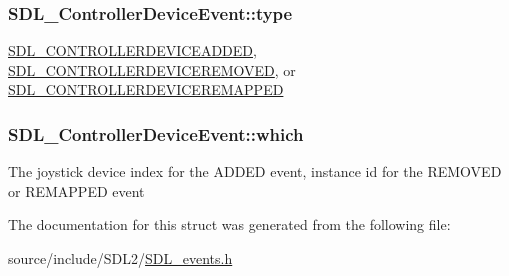 \subsubsection[{type}]{ S\+D\+L\+\_\+\+Controller\+Device\+Event\+::type}\label{struct_s_d_l___controller_device_event_a45b3807eaf70a5f5cf712455da277536}
\hyperlink{_s_d_l__events_8h_a3b589e89be6b35c02e0dd34a55f3fccaa9642de478348da1aba4fb5791e8c5314}{S\+D\+L\+\_\+\+C\+O\+N\+T\+R\+O\+L\+L\+E\+R\+D\+E\+V\+I\+C\+E\+A\+D\+D\+E\+D}, \hyperlink{_s_d_l__events_8h_a3b589e89be6b35c02e0dd34a55f3fccaae00ac6995dfb7b92bfae68b9f47ae07a}{S\+D\+L\+\_\+\+C\+O\+N\+T\+R\+O\+L\+L\+E\+R\+D\+E\+V\+I\+C\+E\+R\+E\+M\+O\+V\+E\+D}, or \hyperlink{_s_d_l__events_8h_a3b589e89be6b35c02e0dd34a55f3fccaaeca87c7b5bb21915d444298449a78ee6}{S\+D\+L\+\_\+\+C\+O\+N\+T\+R\+O\+L\+L\+E\+R\+D\+E\+V\+I\+C\+E\+R\+E\+M\+A\+P\+P\+E\+D} \hypertarget{struct_s_d_l___controller_device_event_accb80de1619c1e790cffb6c888c915db}{}
\subsubsection[{which}]{ S\+D\+L\+\_\+\+Controller\+Device\+Event\+::which}\label{struct_s_d_l___controller_device_event_accb80de1619c1e790cffb6c888c915db}
The joystick device index for the A\+D\+D\+E\+D event, instance id for the R\+E\+M\+O\+V\+E\+D or R\+E\+M\+A\+P\+P\+E\+D event 

The documentation for this struct was generated from the following file\+:\begin{DoxyCompactItemize}
\item 
source/include/\+S\+D\+L2/\hyperlink{_s_d_l__events_8h}{S\+D\+L\+\_\+events.\+h}\end{DoxyCompactItemize}
